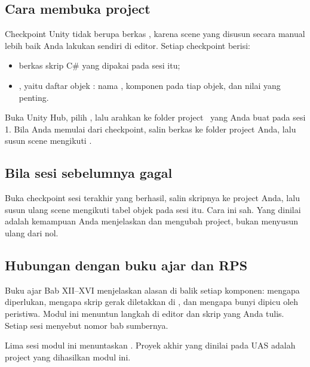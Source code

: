 \subsection*{Cara membuka project}

Checkpoint Unity tidak berupa berkas , karena scene yang disusun
secara manual lebih baik Anda lakukan sendiri di editor. Setiap checkpoint
berisi:

\begin{itemize}[leftmargin=1.4em, itemsep=0.25em]
  \item berkas skrip C\# yang dipakai pada sesi itu;
  \item {}, yaitu daftar objek : nama
        , komponen pada tiap objek, dan nilai
         yang penting.
\end{itemize}

Buka Unity Hub, pilih , lalu arahkan ke folder
project \NamaProject\ yang Anda buat pada sesi 1. Bila Anda memulai dari
checkpoint, salin berkas  ke folder  project
Anda, lalu susun scene mengikuti .

\subsection*{Bila sesi sebelumnya gagal}

Buka checkpoint sesi terakhir yang berhasil, salin skripnya ke project Anda,
lalu susun ulang scene mengikuti tabel objek pada sesi itu. Cara ini sah.
Yang dinilai adalah kemampuan Anda menjelaskan dan mengubah project, bukan
menyusun ulang dari nol.

\subsection*{Hubungan dengan buku ajar dan RPS}

Buku ajar Bab XII--XVI menjelaskan alasan di balik setiap komponen: mengapa
 diperlukan, mengapa skrip gerak diletakkan di
, dan mengapa bunyi dipicu oleh peristiwa. Modul ini
menuntun langkah di editor dan skrip yang Anda tulis. Setiap sesi menyebut
nomor bab sumbernya.

Lima sesi modul ini menuntaskan \ModulSubCPMK. Proyek akhir yang dinilai pada
UAS adalah project yang dihasilkan modul ini.
